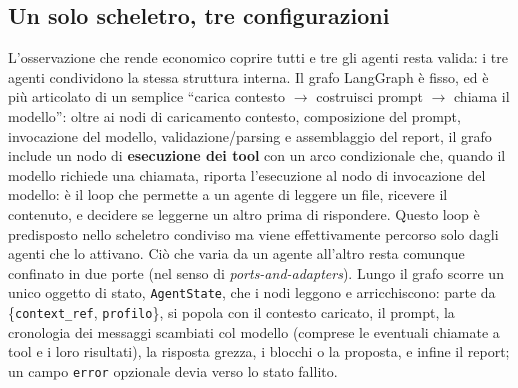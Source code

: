 \documentclass[11pt,a4paper]{article}
\begin{document}
\subsection{Un solo scheletro, tre configurazioni}
\label{sec:scheletro-condiviso}
L'osservazione che rende economico coprire tutti e tre gli agenti resta valida: i tre agenti condividono la stessa struttura interna. Il grafo LangGraph è fisso, ed è più articolato di un semplice ``carica contesto $\to$ costruisci prompt $\to$ chiama il modello'': oltre ai nodi di caricamento contesto, composizione del prompt, invocazione del modello, validazione/parsing e assemblaggio del report, il grafo include un nodo di \textbf{esecuzione dei tool} con un arco condizionale che, quando il modello richiede una chiamata, riporta l'esecuzione al nodo di invocazione del modello: è il loop che permette a un agente di leggere un file, ricevere il contenuto, e decidere se leggerne un altro prima di rispondere. Questo loop è predisposto nello scheletro condiviso ma viene effettivamente percorso solo dagli agenti che lo attivano. Ciò che varia da un agente all'altro resta comunque confinato in due porte (nel senso di \emph{ports-and-adapters}). Lungo il grafo scorre un unico oggetto di stato, \texttt{AgentState}, che i nodi leggono e arricchiscono: parte da \{\texttt{context\_ref}, \texttt{profilo}\}, si popola con il contesto caricato, il prompt, la cronologia dei messaggi scambiati col modello (comprese le eventuali chiamate a tool e i loro risultati), la risposta grezza, i blocchi o la proposta, e infine il report; un campo \texttt{error} opzionale devia verso lo stato fallito.
\end{document}
